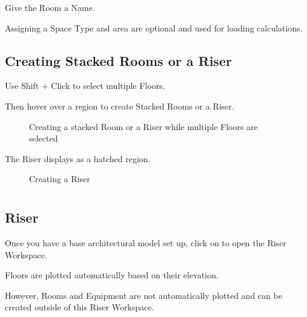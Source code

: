 \documentclass[letterpaper,10pt,english]{sphinxmanual}
\begin{document}
Give the Room a Name.

Assigning a Space Type and area are optional and used for loading calculations.


\subsection{Creating Stacked Rooms or a Riser}
\label{\detokenize{docs/tutorial/index-tutorial:creating-stacked-rooms-or-a-riser}}
Use Shift + Click to select multiple Floors.

Then hover over a region to create Stacked Rooms or a Riser.

\begin{figure}[H]
\centering
\capstart

\noindent{}
\caption{Creating a stacked Room or a Riser while multiple Floors are selected}\label{\detokenize{docs/tutorial/index-tutorial:id7}}\end{figure}

The Riser displays as a hatched region.

\begin{figure}[H]
\centering
\capstart

\noindent{}
\caption{Creating a Riser}\label{\detokenize{docs/tutorial/index-tutorial:id8}}\end{figure}


\section{}
\label{\detokenize{docs/tutorial/index-tutorial:modeling-the-electrical-system}}\label{\detokenize{docs/tutorial/index-tutorial:modeling-electrical-system}}

\subsection{Riser}
\label{\detokenize{docs/tutorial/index-tutorial:riser}}
Once you have a base architectural model set up, click on {\hyperref[\detokenize{docs/userguide/buildingelectricalmodel/riser/index-riser:riser}]{}} to open the Riser Workspace.

Floors are plotted automatically based on their elevation.

However, Rooms and Equipment are not automatically plotted and can be created outside of this Riser Workspace.
\end{document}
